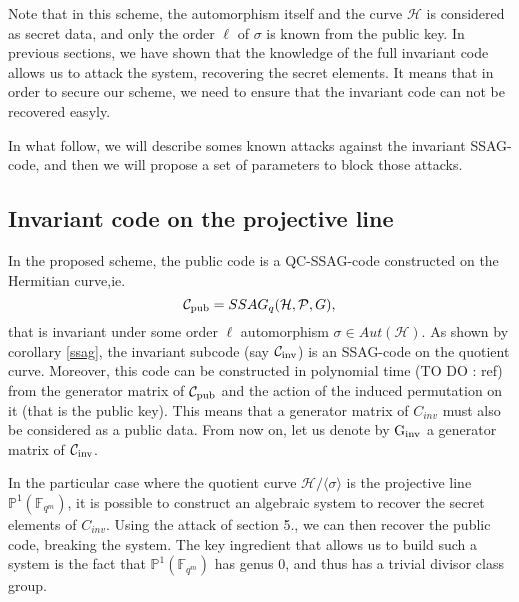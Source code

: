 \documentclass[10pt]{article}
\newcommand{\s}{\vspace{0.3cm}}
\newcommand{\fqm}{\mathbb{F}_{q^m}}
\newcommand{\PR}{\mathcal{P}}
\begin{document}
Note that in this scheme, the automorphism itself and the curve $\mathcal{H}$ is considered as secret data, and only the order $\ell$ of $\sigma$ is known from the public key. In previous sections, we have shown that the knowledge of the full invariant code allows us to attack the system, recovering the secret elements. It means that in order to secure our scheme, we need to ensure that the invariant code can not be recovered easyly. 

\s

In what follow, we will describe somes known attacks against the invariant SSAG-code, and then we will propose a set of parameters to block those attacks.

\s

\subsection{Invariant code on the projective line}

\s

In the proposed scheme, the public code is a QC-SSAG-code constructed on the Hermitian curve,ie. 
\[\mathcal{C}_{\rm pub} = SSAG_q(\mathcal{H},\PR,G),\]
that is invariant under some order $\ell$ automorphism $\sigma \in Aut(\mathcal{H})$. As shown by corollary \ref{ssag}, the invariant subcode (say $\mathcal{C}_{\rm inv}$) is an SSAG-code on the quotient curve. Moreover, this code can be constructed in polynomial time \color{red} (TO DO : ref) \color{black} from the generator matrix of $\mathcal{C}_{\rm pub}$ and the action of the induced permutation on it (that is the public key). This means that a generator matrix of $C_{inv}$ must also be considered as a public data. From now on, let us denote by $\rm G_{inv}$ a generator matrix of $\mathcal{C}_{\rm inv}$.  

\s

In the particular case where the quotient curve $\mathcal{H}/\langle\sigma\rangle$ is the projective line $\mathbb{P}^1(\fqm)$, it is possible to construct an algebraic system to recover the secret elements of $C_{inv}$. Using the attack of section 5., we can then recover the public code, breaking the system. The key ingredient that allows us to build such a system is the fact that $\mathbb{P}^1(\fqm)$ has genus $0$, and thus has a trivial divisor class group. 

\s
\end{document}
